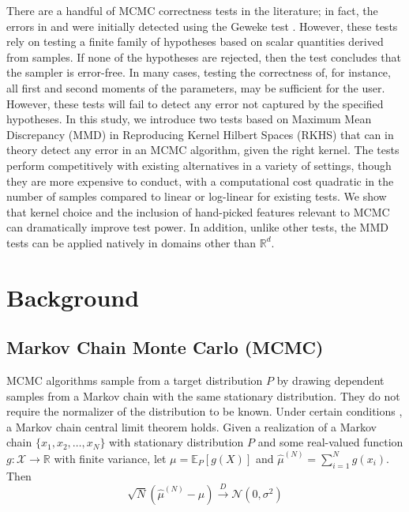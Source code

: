 \documentclass[a4paper,11pt]{article}
\newcommand{\E}{\mathbb{E}}
\begin{document}
There are a handful of MCMC correctness tests in the literature; in fact, the errors in \cite{del_negro_time_2015} and \cite{karlsson_corrigendum_2017} were initially detected using the Geweke test \cite{geweke_getting_2004}. However, these tests rely on testing a finite family of hypotheses based on scalar quantities derived from samples. If none of the hypotheses are rejected, then the test concludes that the sampler is error-free. In many cases, testing the correctness of, for instance, all first and second moments of the parameters, may be sufficient for the user. However, these tests will fail to detect any error not captured by the specified hypotheses. In this study, we introduce two tests based on Maximum Mean Discrepancy (MMD) in Reproducing Kernel Hilbert Spaces (RKHS) that can in theory detect any error in an MCMC algorithm, given the right kernel. The tests perform competitively with existing alternatives in a variety of settings, though they are more expensive to conduct, with a computational cost quadratic in the number of samples compared to linear or log-linear for existing tests. We show that kernel choice and the inclusion of hand-picked features relevant to MCMC can dramatically improve test power. In addition, unlike other tests, the MMD tests can be applied natively in domains other than $\mathbb{R}^{d}$.

\label{section:intro}
\section{Background}
\subsection{Markov Chain Monte Carlo (MCMC)}
MCMC algorithms sample from a target distribution $P$ by drawing dependent samples from a Markov chain with the same stationary distribution. They do not require the normalizer of the distribution to be known. Under certain conditions \cite{jones_markov_2004}, a Markov chain central limit theorem holds. Given a realization of a Markov chain $\{x_{1}, x_{2}, \ldots, x_{N}\}$ with stationary distribution $P$ and some real-valued function $g:\mathcal{X} \rightarrow \mathbb{R}$ with finite variance, let $\mu = \E_{P}[g(X)]$ and $\hat{\mu}^{(N)} = \sum_{i=1}^{N}g(x_{i})$. Then
\begin{equation}
    \sqrt{N}(\hat{\mu}^{(N)} - \mu) \overset{D}{\rightarrow} \mathcal{N}(0, \sigma^{2})
    \label{eq:mcmc_clt}
\end{equation}
\end{document}
